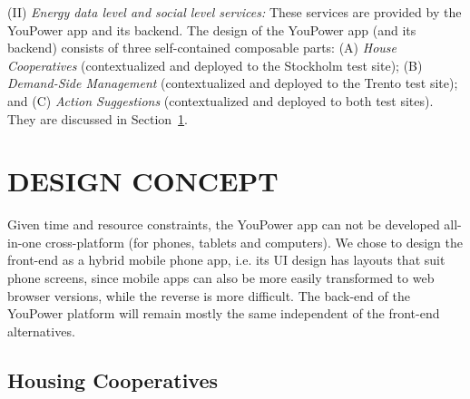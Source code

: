 (II) \textit{Energy data level and social level services:} These services are provided by the YouPower app and its backend. The design of the YouPower app (and its backend) consists of three self-contained composable parts: (A) \textit{House Cooperatives} (contextualized and deployed to the Stockholm test site); (B) \textit{Demand-Side Management} (contextualized and deployed
to the Trento test site); and (C) \textit{Action Suggestions} (contextualized and deployed to both test sites). They are discussed in Section~\ref{sect:design_concept}.

\section{\uppercase{Design Concept}}
\label{sect:design_concept}

Given time and resource constraints, the YouPower app can not be developed all-in-one cross-platform (for phones, tablets and computers). We chose to design the front-end as a hybrid mobile phone app, i.e. its UI design has layouts that suit phone screens, %
since mobile apps can also be more easily transformed to web browser versions, while the reverse is more difficult. The back-end of the YouPower platform will remain mostly the same independent of the front-end alternatives. 

\subsection{Housing Cooperatives}
\label{sect:brf}

